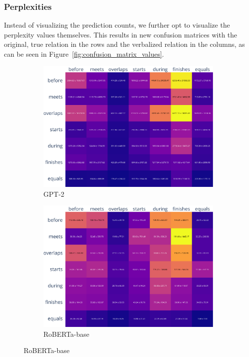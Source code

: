 \documentclass[11pt]{article}
\begin{document}
\subsubsection{Perplexities}
\label{sec:perplexities}
Instead of visualizing the prediction counts, we further opt to visualize the perplexity values themselves.
This results in new confusion matrices with the original, true relation in the rows and the verbalized relation in the columns, as can be seen in Figure~\ref{fig:confusion_matrix_values}. 
\begin{figure}
  \centering
    \begin{subfigure}[b]{0.95\textwidth}
      \centering
      \includegraphics[width=0.95\columnwidth, height=0.3\textheight, keepaspectratio, valign=c]{../plots/gpt2_confusion_matrix_values.pdf}
      \caption{GPT-2}
    \end{subfigure}

    \vspace{1em}

    \begin{subfigure}[b]{0.95\textwidth}
      \centering
      \includegraphics[width=0.95\columnwidth, height=0.3\textheight, keepaspectratio, valign=c]{../plots/roberta-base_confusion_matrix_values.pdf}
      \caption{RoBERTa-base}
    \end{subfigure}


\end{figure}
\end{document}
